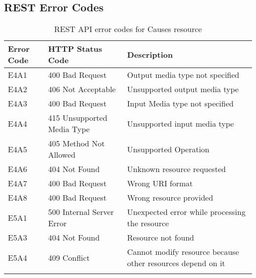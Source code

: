\subsection{REST Error Codes}


\begin{longtable}{|p{}|p{} |p{}|} 
\hline
\textbf{Error Code} & \textbf{HTTP Status Code} & \textbf{Description} \\\hline
E4A1 & 400 Bad Request & Output media type not specified \\\hline
E4A2 & 406 Not Acceptable & Unsupported output media type \\\hline
E4A3 & 400 Bad Request & Input Media type not specified \\\hline
E4A4 & 415 Unsupported Media Type &  Unsupported input media type \\\hline
E4A5 & 405 Method Not Allowed &  Unsupported Operation \\\hline
E4A6 & 404 Not Found &  Unknown resource requested \\\hline
E4A7 & 400 Bad Request &  Wrong URI format \\\hline
E4A8 & 400 Bad Request &  Wrong resource provided \\\hline
E5A1 & 500 Internal Server Error &  Unexpected error while processing the resource \\\hline
E5A3 & 404 Not Found &  Resource not found \\\hline
E5A4 & 409 Conflict &  Cannot modify resource because other resources depend on it \\\hline
\caption{REST API error codes for Causes resource}
\label{tab:termGlossary}
\end{longtable}
